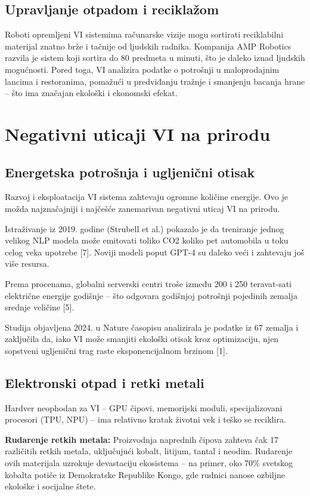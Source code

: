\documentclass[12pt,a4paper]{article}
\begin{document}
\subsection{Upravljanje otpadom i reciklažom}
Roboti opremljeni VI sistemima računarske vizije mogu sortirati reciklabilni materijal znatno brže i tačnije od ljudskih radnika. Kompanija AMP Robotics razvila je sistem koji sortira do 80 predmeta u minuti, što je daleko iznad ljudskih mogućnosti. Pored toga, VI analizira podatke o potrošnji u maloprodajnim lancima i restoranima, pomažući u predviđanju tražnje i smanjenju bacanja hrane -- što ima značajan ekološki i ekonomski efekat.

\section{Negativni uticaji VI na prirodu}

\subsection{Energetska potrošnja i ugljenični otisak}
Razvoj i eksploatacija VI sistema zahtevaju ogromne količine energije. Ovo je možda najznačajniji i najčešće zanemarivan negativni uticaj VI na prirodu.

Istraživanje iz 2019. godine (Strubell et al.) pokazalo je da treniranje jednog velikog NLP modela može emitovati toliko CO2 koliko pet automobila u toku celog veka upotrebe [7]. Noviji modeli poput GPT-4 su daleko veći i zahtevaju još više resursa.

Prema procenama, globalni serverski centri troše između 200 i 250 teravat-sati električne energije godišnje -- što odgovara godišnjoj potrošnji pojedinih zemalja srednje veličine [5].

Studija objavljena 2024. u Nature časopisu analizirala je podatke iz 67 zemalja i zaključila da, iako VI može smanjiti ekološki otisak kroz optimizaciju, njen sopstveni ugljenični trag raste eksponencijalnom brzinom [1].

\subsection{Elektronski otpad i retki metali}
Hardver neophodan za VI -- GPU čipovi, memorijski moduli, specijalizovani procesori (TPU, NPU) -- ima relativno kratak životni vek i teško se reciklira.

\textbf{Rudarenje retkih metala:} Proizvodnja naprednih čipova zahteva čak 17 različitih retkih metala, uključujući kobalt, litijum, tantal i neodim. Rudarenje ovih materijala uzrokuje devastaciju ekosistema -- na primer, oko 70\% svetskog kobalta potiče iz Demokratske Republike Kongo, gde rudnici nanose ozbiljne ekološke i socijalne štete.
\end{document}
